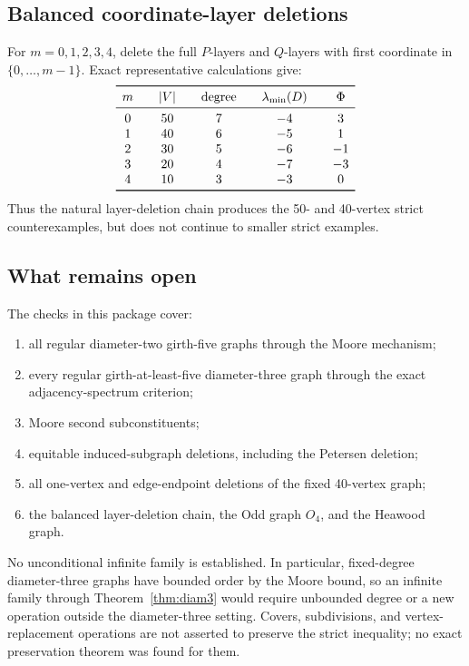 \documentclass[11pt,reqno]{amsart}
\newcommand{\PhiScore}{\Phi}
\theoremstyle{plain}
\theoremstyle{definition}
\theoremstyle{remark}
\begin{document}
\subsection{Balanced coordinate-layer deletions}
For $m=0,1,2,3,4$, delete the full $P$-layers and $Q$-layers with first
coordinate in $\{0,\ldots,m-1\}$.  Exact representative calculations give:
\[
\begin{array}{c@{\qquad}c@{\qquad}c@{\qquad}c@{\qquad}c}
\toprule
m&|V|&\text{degree}&\lambda_{\min}(D)&\PhiScore\\
\midrule
0&50&7&-4&3\\
1&40&6&-5&1\\
2&30&5&-6&-1\\
3&20&4&-7&-3\\
4&10&3&-3&0\\
\bottomrule
\end{array}
\]
Thus the natural layer-deletion chain produces the 50- and 40-vertex strict
counterexamples, but does not continue to smaller strict examples.

\subsection{What remains open}
The checks in this package cover:
\begin{enumerate}[label=(\roman*)]
\item all regular diameter-two girth-five graphs through the Moore mechanism;
\item every regular girth-at-least-five diameter-three graph through the exact
      adjacency-spectrum criterion;
\item Moore second subconstituents;
\item equitable induced-subgraph deletions, including the Petersen deletion;
\item all one-vertex and edge-endpoint deletions of the fixed 40-vertex graph;
\item the balanced layer-deletion chain, the Odd graph $O_4$, and the Heawood
      graph.
\end{enumerate}
No unconditional infinite family is established.  In particular, fixed-degree
diameter-three graphs have bounded order by the Moore bound, so an infinite
family through Theorem~\ref{thm:diam3} would require unbounded degree or a
new operation outside the diameter-three setting.  Covers, subdivisions, and
vertex-replacement operations are not asserted to preserve the strict
inequality; no exact preservation theorem was found for them.
\end{document}
